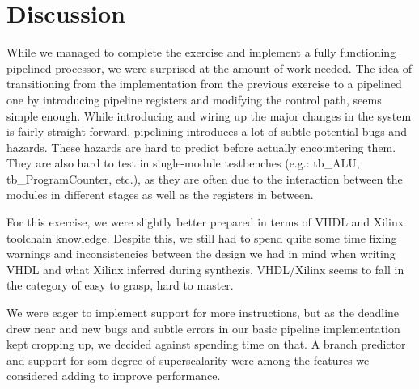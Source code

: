 \chapter{Discussion}

While we managed to complete the exercise and implement a fully functioning pipelined processor, we were surprised at the amount of work needed.
The idea of transitioning from the implementation from the previous exercise to a pipelined one by introducing pipeline registers and modifying the control path, seems simple enough.
While introducing and wiring up the major changes in the system is fairly straight forward, pipelining introduces a lot of subtle potential bugs and hazards.
These hazards are hard to predict before actually encountering them.
They are also hard to test in single-module testbenches (e.g.: tb\_ALU, tb\_ProgramCounter, etc.), as they are often due to the interaction between the modules in different stages as well as the registers in between.

For this exercise, we were slightly better prepared in terms of VHDL and Xilinx toolchain knowledge.
Despite this, we still had to spend quite some time fixing warnings and inconsistencies between the design we had in mind when writing VHDL and what Xilinx inferred during synthezis.
VHDL/Xilinx seems to fall in the category of easy to grasp, hard to master.

We were eager to implement support for more instructions, but as the deadline drew near and new bugs and subtle errors in our basic pipeline implementation kept cropping up, we decided against spending time on that.
A branch predictor and support for som degree of superscalarity were among the features we considered adding to improve performance.
